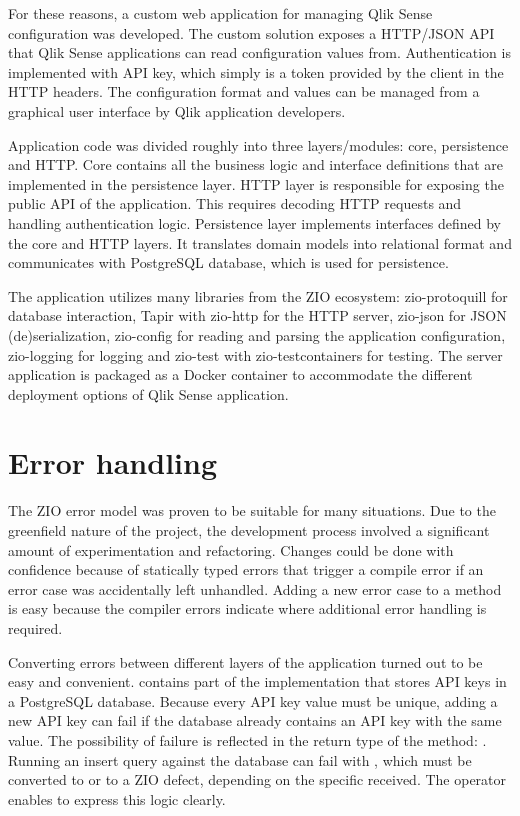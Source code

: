 For these reasons, a custom web application for managing Qlik Sense configuration was developed. The custom solution exposes a HTTP/JSON API that Qlik Sense applications can read configuration values from. Authentication is implemented with API key, which simply is a token provided by the client in the HTTP headers. The configuration format and values can be managed from a graphical user interface by Qlik application developers.

Application code was divided roughly into three layers/modules: core, persistence and HTTP.
Core contains all the business logic and interface definitions that are implemented in the persistence layer. HTTP layer is responsible for exposing the public API of the application. This requires decoding HTTP requests and handling authentication logic. Persistence layer implements interfaces defined by the core and HTTP layers. It translates domain models into relational format and communicates with PostgreSQL database, which is used for persistence.

The application utilizes many libraries from the ZIO ecosystem: zio-protoquill for database interaction, Tapir with zio-http for the HTTP server, zio-json for JSON (de)serialization, zio-config for reading and parsing the application configuration, zio-logging for logging and zio-test with zio-testcontainers for testing. The server application is packaged as a Docker container to accommodate the different deployment options of Qlik Sense application.


\section{Error handling}
The ZIO error model was proven to be suitable for many situations. Due to the greenfield nature of the project, the development process involved a significant amount of experimentation and refactoring. Changes could be done with confidence because of statically typed errors that trigger a compile error if an error case was accidentally left unhandled. Adding a new error case to a method is easy because the compiler errors indicate where additional error handling is required.

Converting errors between different layers of the application turned out to be easy and convenient.  contains part of the  implementation that stores API keys in a PostgreSQL database. Because every API key value must be unique, adding a new API key can fail if the database already contains an API key with the same value. The possibility of failure is reflected in the return type of the  method: . Running an insert query against the database can fail with , which must be converted to  or to a ZIO defect, depending on the specific  received. The  operator enables to express this logic clearly.

